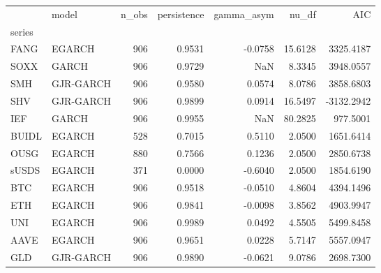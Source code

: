 \begin{tabular}{llrrrrr}
\toprule
 & model & n\_obs & persistence & gamma\_asym & nu\_df & AIC \\
series &  &  &  &  &  &  \\
\midrule
FANG & EGARCH & 906 & 0.9531 & -0.0758 & 15.6128 & 3325.4187 \\
SOXX & GARCH & 906 & 0.9729 & NaN & 8.3345 & 3948.0557 \\
SMH & GJR-GARCH & 906 & 0.9580 & 0.0574 & 8.0786 & 3858.6803 \\
SHV & GJR-GARCH & 906 & 0.9899 & 0.0914 & 16.5497 & -3132.2942 \\
IEF & GARCH & 906 & 0.9955 & NaN & 80.2825 & 977.5001 \\
BUIDL & EGARCH & 528 & 0.7015 & 0.5110 & 2.0500 & 1651.6414 \\
OUSG & EGARCH & 880 & 0.7566 & 0.1236 & 2.0500 & 2850.6738 \\
sUSDS & EGARCH & 371 & 0.0000 & -0.6040 & 2.0500 & 1854.6190 \\
BTC & EGARCH & 906 & 0.9518 & -0.0510 & 4.8604 & 4394.1496 \\
ETH & EGARCH & 906 & 0.9841 & -0.0098 & 3.8562 & 4903.9947 \\
UNI & EGARCH & 906 & 0.9989 & 0.0492 & 4.5505 & 5499.8458 \\
AAVE & EGARCH & 906 & 0.9651 & 0.0228 & 5.7147 & 5557.0947 \\
GLD & GJR-GARCH & 906 & 0.9890 & -0.0621 & 9.0786 & 2698.7300 \\
\bottomrule
\end{tabular}
